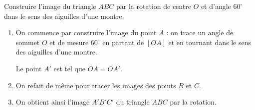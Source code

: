 \newpage

\begin{methode}
	Construire l'image du triangle $ABC$ par la rotation de centre $O$ et d'angle $60^\circ$ dans le sens des aiguilles d'une montre.

	\begin{correction}
		\nline
		\begin{enumerate}
			\item On commence par construire l'image du point $A$ : on trace un angle de sommet $O$ et de mesure $60^\circ$ en partant de $[OA]$ et en tournant dans le sens des aiguilles d'une montre.

			      Le point $A'$ est tel que $OA = OA'$.

			\item On refait de même pour tracer les images des points $B$ et $C$.

			\item On obtient ainsi l'image $A'B'C'$ du triangle $ABC$ par la rotation.
		\end{enumerate}


\end{correction}
\end{methode}
